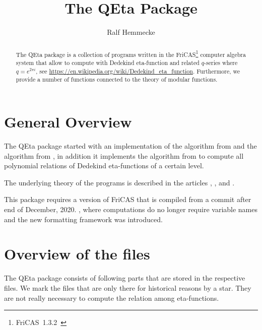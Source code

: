 \documentclass{article}
\begin{document}
\title{The QEta Package}
\author{Ralf Hemmecke}
\maketitle
\begin{abstract}
  The QEta package is a collection of programs written in the
  FriCAS\footnote{FriCAS~1.3.2~\cite{FriCAS}} computer algebra system
  that allow to compute with Dedekind eta-function and related
  $q$-series where $q=e^{2\pi i}$, see
  \url{https://en.wikipedia.org/wiki/Dedekind_eta_function}.
  Furthermore, we provide a number of functions connected to the
  theory of modular functions.
\end{abstract}

\tableofcontents

\section{General Overview}

The QEta package started with an implementation of the 
algorithm from \cite{Radu:RamanujanKolberg:2015} and the \algoSamba{}
algorithm from \cite{Hemmecke:DancingSambaRamanujan:2018}, in addition
it implements the algorithm from
\cite{Hemmecke+Radu:EtaRelations:2018} to compute all polynomial
relations of Dedekind eta-functions of a certain level.

The underlying theory of the programs is described in the articles
\cite{Radu:RamanujanKolberg:2015},
\cite{Hemmecke:DancingSambaRamanujan:2018}, and
\cite{Hemmecke+Radu:EtaRelations:2018}.

This package requires a version of FriCAS that is compiled from a
commit after end of December, 2020. \ie, where \GB{} computations do
no longer require variable names and the new formatting framework was
introduced.

\section{Overview of the files}

The QEta package consists of following parts that are stored in the
respective  files. We mark the files that are only
there for historical reasons by a star. They are not really necessary
to compute the relation among eta-functions.
\end{document}
